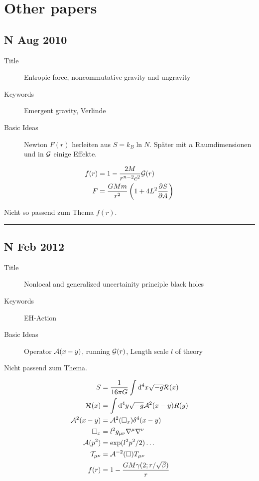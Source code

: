 \documentclass[10pt,a4paper, fleqn]{article}
\begin{document}
\section{Other papers}
\begin{multicols}{2}
\subsection{N Aug 2010}
\begin{description}
  \item[Title] Entropic force, noncommutative gravity and ungravity
  \item[Keywords] Emergent gravity, Verlinde
  \item[Basic Ideas] Newton $F(r)$ herleiten aus $S=k_B \ln N$. Später mit $n$ Raumdimensionen und in $\cal G$ einige Effekte.
\end{description}


\vfill
\columnbreak
\begin{align}
f(r) &= 1 - \frac{2M}{r^{n-2} c^2} {\cal G}(r) \\
F &= \frac{G M m}{r^2} \left( 1 + 4 L^2 \frac{\partial S}{\partial A} \right)
\end{align}

Nicht so passend zum Thema $f(r)$.

\end{multicols}
\rule{0.9\textwidth}{0.4pt}
\pagebreak
\begin{multicols}{2}

\subsection{N Feb 2012}
\begin{description}
  \item[Title] Nonlocal and generalized uncertainity principle black holes
  \item[Keywords] EH-Action
  \item[Basic Ideas] Operator ${\cal A}(x-y)$, running ${\cal G}(r)$, Length scale $l$ of theory
\end{description}

Nicht passend zum Thema.

\vfill
\columnbreak

\begin{align*}
S &= \frac{1}{16 \pi G} \int \mathrm{d}^4 x \sqrt{-g} {\cal R}(x) \\
{\cal R}(x) &= \int \mathrm{d}^4 y \sqrt{-g} {\cal A}^2(x-y) R(y) \\
{\cal A}^2(x-y) &= {\cal A}^2 (\square_x) \delta^4 (x-y) \\
\square_x &= l^2 g_{\mu\nu} \nabla^\mu \nabla^\nu \\
{\cal A}(p^2) &= \exp( {l}^2 p^2 / 2) \dots \\
{\cal T}_{\mu \nu} &= {\cal A}^{-2}(\square) T_{\mu \nu} \\
f(r) &= 1 - \frac{G M \gamma(2;r/\sqrt{\beta})}{r}
\end{align*}

\end{multicols}
\end{document}
